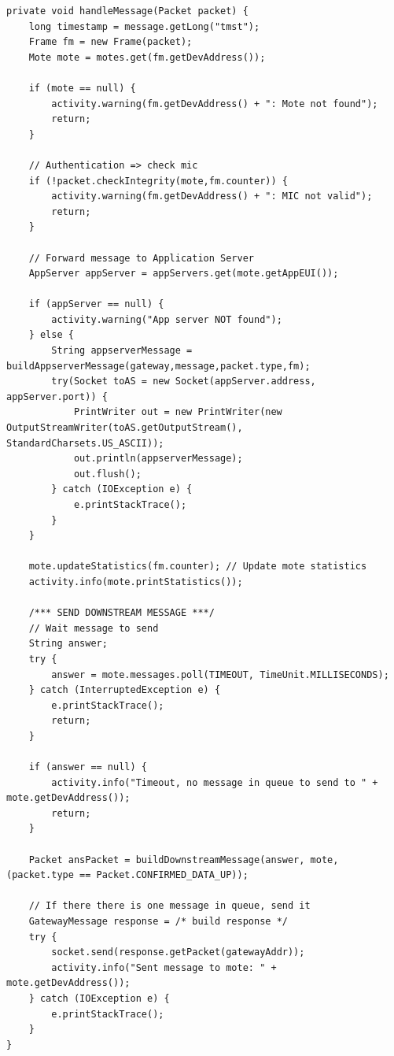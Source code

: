 \begin{lstlisting}[caption=Handle message in NetworkServerMoteHandler.java\label{list:handlemsg}]
private void handleMessage(Packet packet) {
    long timestamp = message.getLong("tmst");
    Frame fm = new Frame(packet);
    Mote mote = motes.get(fm.getDevAddress());

    if (mote == null) {
        activity.warning(fm.getDevAddress() + ": Mote not found");
        return;
    }

    // Authentication => check mic
    if (!packet.checkIntegrity(mote,fm.counter)) {
        activity.warning(fm.getDevAddress() + ": MIC not valid");
        return;
    }

    // Forward message to Application Server
    AppServer appServer = appServers.get(mote.getAppEUI());

    if (appServer == null) {
        activity.warning("App server NOT found");
    } else {
        String appserverMessage = buildAppserverMessage(gateway,message,packet.type,fm);
        try(Socket toAS = new Socket(appServer.address, appServer.port)) {
            PrintWriter out = new PrintWriter(new OutputStreamWriter(toAS.getOutputStream(), StandardCharsets.US_ASCII));
            out.println(appserverMessage);
            out.flush();
        } catch (IOException e) {
            e.printStackTrace();
        }
    }

    mote.updateStatistics(fm.counter); // Update mote statistics
    activity.info(mote.printStatistics());

    /*** SEND DOWNSTREAM MESSAGE ***/
    // Wait message to send
    String answer;
    try {
        answer = mote.messages.poll(TIMEOUT, TimeUnit.MILLISECONDS);
    } catch (InterruptedException e) {
        e.printStackTrace();
        return;
    }
    
    if (answer == null) {
        activity.info("Timeout, no message in queue to send to " + mote.getDevAddress());
        return;
    }

    Packet ansPacket = buildDownstreamMessage(answer, mote, (packet.type == Packet.CONFIRMED_DATA_UP));

    // If there there is one message in queue, send it
    GatewayMessage response = /* build response */
    try {
        socket.send(response.getPacket(gatewayAddr));
        activity.info("Sent message to mote: " + mote.getDevAddress());
    } catch (IOException e) {
        e.printStackTrace();
    }
}
\end{lstlisting}

